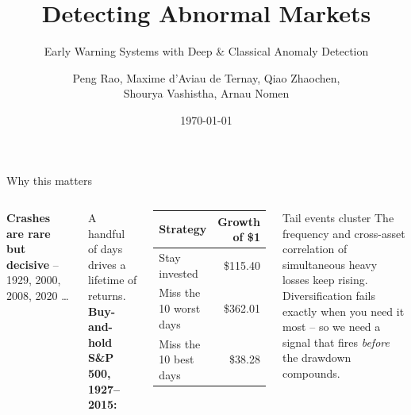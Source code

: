 \documentclass[10pt,aspectratio=169]{beamer}
\title{Detecting Abnormal Markets}
\subtitle{Early Warning Systems with Deep \& Classical Anomaly Detection}
\date{\today}
\author[Peng Rao et al.]{\texorpdfstring{\scriptsize Peng Rao, Maxime d'Aviau de Ternay, Qiao Zhaochen,\\ Shourya Vashistha, Arnau Nomen}{Peng Rao et al.}}
\institute{Politecnico di Milano}
\begin{document}
\maketitle

\begin{frame}{Why this matters}
	\begin{columns}[T,onlytextwidth]
		\textbf{Crashes are rare but decisive} -- 1929, 2000, 2008, 2020 \dots
		\vspace{0.5em}

		A handful of days drives a lifetime of returns. \\
		\textbf{Buy-and-hold S\&P 500, 1927--2015:}
		\begin{center}
			\small
			\begin{tabular}{lr}
				\toprule
				Strategy               & Growth of \$1      \\
				\midrule
				Stay invested          & \$115.40           \\
				Miss the 10 worst days & \$362.01           \\
				Miss the 10 best days  & \phantom{0}\$38.28 \\
				\bottomrule
			\end{tabular}
		\end{center}

		\begin{alertblock}{Tail events cluster}
			The frequency and cross-asset correlation of simultaneous heavy
			losses keep rising. \\[0.4em]
			Diversification fails exactly when you need it most -- so we need a
			signal that fires \emph{before} the drawdown compounds.
		\end{alertblock}
	\end{columns}
\end{frame}
\end{document}
